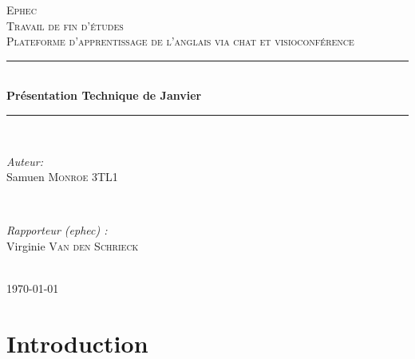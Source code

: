 \documentclass{report}
\begin{document}
\begin{titlepage}

\newcommand{\HRule}{\rule{\linewidth}{0.5mm}} %

\center %
 

\textsc{\LARGE Ephec }\\[1.5cm] %
\textsc{\Large Travail de fin d'études}\\[0.5cm] %
\textsc{\large Plateforme d'apprentissage de l'anglais via chat et visioconférence}\\[0.5cm] %


\HRule \\[0.4cm]
{ \huge \bfseries Présentation Technique de Janvier}\\[0.4cm] %
\HRule \\[1.5cm]
 

\begin{minipage}{0.4\textwidth}
\begin{flushleft} \large
\emph{Auteur:}\\
Samuen \textsc{Monroe} 3TL1 %
\end{flushleft}
\end{minipage}
~
\begin{minipage}{0.4\textwidth}
\begin{flushright} \large
\emph{Rapporteur (ephec) :} \\
Virginie \textsc{Van den Schrieck} %
\end{flushright}
\end{minipage}\\[4cm]



{\large \today}\\[3cm] %


\end{titlepage}

\newpage
\thispagestyle{empty}
\mbox{}

\tableofcontents
\clearpage


\section{Introduction}
\end{document}
